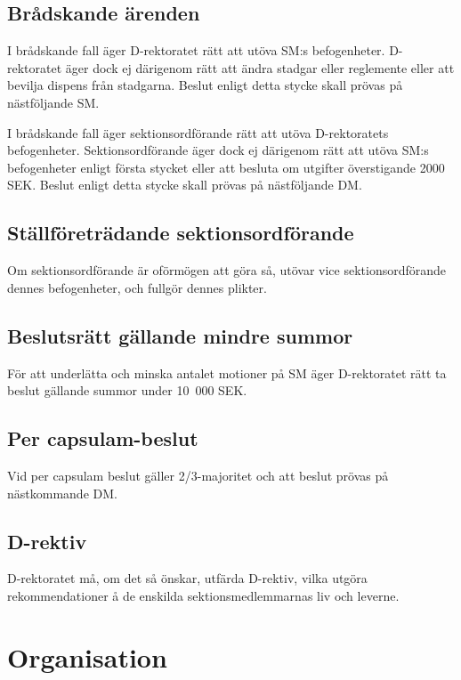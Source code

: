 \documentclass{dgovdoc}
\begin{document}
\subsection{Brådskande ärenden}

I brådskande fall äger D-rektoratet rätt att utöva SM:s befogenheter.
D-rektoratet äger dock ej därigenom rätt att ändra stadgar eller reglemente
eller att bevilja dispens från stadgarna. Beslut enligt detta stycke skall
prövas på nästföljande SM.

I brådskande fall äger sektionsordförande rätt att utöva D-rektoratets
befogenheter. Sektionsordförande äger dock ej därigenom rätt att utöva SM:s
befogenheter enligt första stycket eller att besluta om utgifter överstigande
2000 SEK. Beslut enligt detta stycke skall prövas på nästföljande DM.

\subsection{Ställföreträdande sektionsordförande}

Om sektionsordförande är oförmögen att göra så, utövar vice sektionsordförande
dennes befogenheter, och fullgör dennes plikter.

\subsection{Beslutsrätt gällande mindre summor}

För att underlätta och minska antalet motioner på SM äger D-rektoratet rätt ta
beslut gällande summor under 10~000 SEK.

\subsection{Per capsulam-beslut}

Vid per capsulam beslut gäller 2/3-majoritet och att beslut prövas på
nästkommande DM.

\subsection{D-rektiv}

D-rektoratet må, om det så önskar, utfärda D-rektiv, vilka utgöra
rekommendationer å de enskilda sektionsmedlemmarnas liv och leverne.

\section{Organisation}
\end{document}
